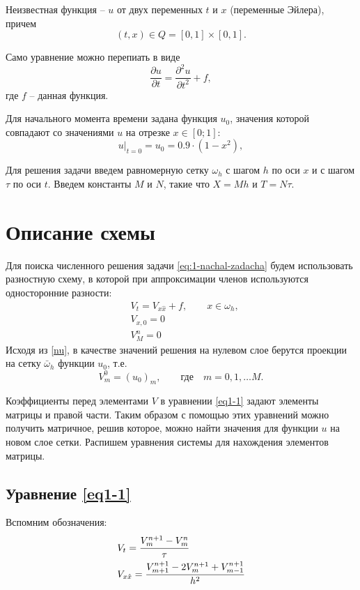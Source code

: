 \documentclass[12pt]{extarticle}
\numberwithin{equation}{section}
\begin{document}
Неизвестная функция -- $u$ от двух переменных $t$ и $x$ (переменные Эйлера), причем $$(t, x) \in Q = [0, 1] \times [0, 1].$$

Само уравнение можно перепиать в виде
\begin{equation}
\frac{\partial u}{\partial t} = \frac{\partial ^2 u}{\partial t^2} + f, \label{eq1}
\end{equation}
где $f$ -- данная функция.

Для начального момента  времени задана функция $u_0$, значения которой совпадают со значениями $u$ на отрезке $x \in [0; 1]$:
\begin{equation}
u |_{t=0} = u_0 = 0.9 \cdot (1 - x^2), \label{nu}
\end{equation}

Для решения задачи введем равномерную сетку $\omega_h$ с шагом $h$ по оси $x$ и с шагом $\tau$ по оси $t$. 
Введем константы $M$ и $N$, такие что $X = Mh$ и $T = N\tau$.

\section{Описание схемы} \label{scheme}
Для поиска численного решения задачи \ref{eq:1-nachal-zadacha} будем использовать разностную схему, в которой при аппроксимации членов используются односторонние разности:
	\begin{align}
		&V_t= V_{x \hat x} + f,\qquad x \in \omega_h, \label{eq1-1}\\
		&V_{x, 0} = 0 \label{eq1-2}\\
		&{V^n_M} = 0 \label{eq1-3}
	\end{align}
Исходя из \ref{nu}, в качестве значений решения на нулевом слое берутся проекции на сетку $\bar{\omega}_h$ функции $u_0$, т.е.
$$V_m^0 = (u_0)_m, \qquad \mbox{где} \quad m = 0, 1, \dots M.$$

Коэффициенты перед элементами $V$ в уравнении \ref{eq1-1} задают элементы матрицы и правой части.
Таким образом с помощью этих уравнений можно получить матричное, решив которое, можно найти значения для функции $u$ на новом слое сетки.
Распишем уравнения системы для нахождения элементов матрицы.

\subsection{Уравнение \ref{eq1-1}}
Вспомним обозначения:
\begin{align}
&V_t = \cfrac{V_m^{n+1} - V_m^n}{\tau} \label{eq2:1:1}\\
&V_{x \hat x} = \cfrac{V_{m+1}^{n+1} - 2V_m^{n+1} + V_{m-1}^{n+1}}{h^2} \label{eq:2:1:2}
\end{align}
\end{document}
